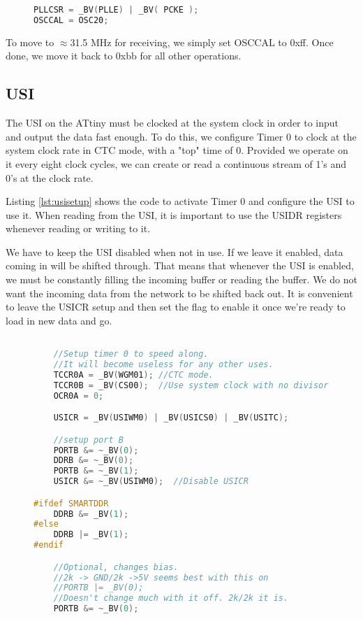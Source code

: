 \documentclass[13pt]{ltxdoc}
\begin{document}
\begin{figure}
\begin{lstlisting}[caption=Clock Setup\label{lst:clkcmd},language=C, frame=single]
PLLCSR = _BV(PLLE) | _BV( PCKE );
OSCCAL = OSC20;
\end{lstlisting}
\end{figure}


To move to $\approx$31.5 MHz for receiving, we simply set OSCCAL to 0xff.  Once done, we move it back to 0xbb for all other operations.

\subsection{USI}
The USI on the ATtiny must be clocked at the system clock in order to input and output the data fast enough.
To do this, we configure Timer 0 to clock at the system clock rate in CTC mode, with a "top" time of 0.
Provided we operate on it every eight clock cycles, we can create or read
a continuous stream of 1's and 0's at the clock rate.

Listing \ref{lst:usisetup} shows the code to activate Timer 0 and configure the USI to use it. 
When reading from the USI, it is important to use the USIDR registers whenever reading or writing to it.

We have to keep the USI disabled when not in use.  If we leave it enabled, data coming in will be shifted through.  
That means that whenever the USI is enabled, we must be constantly filling the incoming buffer or reading the buffer.
We do not want the incoming data from the network to be shifted back out.  It is convenient to leave the USICR setup and then
set the flag to enable it once we're ready to load in new data and go.


\begin{figure}
\begin{lstlisting}[caption=USI Setup\label{lst:usisetup},language=C, frame=single]

	//Setup timer 0 to speed along.
	//It will become useless for any other uses.
	TCCR0A = _BV(WGM01); //CTC mode.
	TCCR0B = _BV(CS00);  //Use system clock with no divisor.
	OCR0A = 0;

	USICR = _BV(USIWM0) | _BV(USICS0) | _BV(USITC);

	//setup port B
	PORTB &= ~_BV(0); 
	DDRB &= ~_BV(0);
	PORTB &= ~_BV(1);
	USICR &= ~_BV(USIWM0);  //Disable USICR

#ifdef SMARTDDR
	DDRB &= _BV(1);
#else
	DDRB |= _BV(1);
#endif

	//Optional, changes bias.
	//2k -> GND/2k ->5V seems best with this on
	//PORTB |= _BV(0);
	//Doesn't change much with it off. 2k/2k it is.
	PORTB &= ~_BV(0);

\end{lstlisting}
\end{figure}
\end{document}
